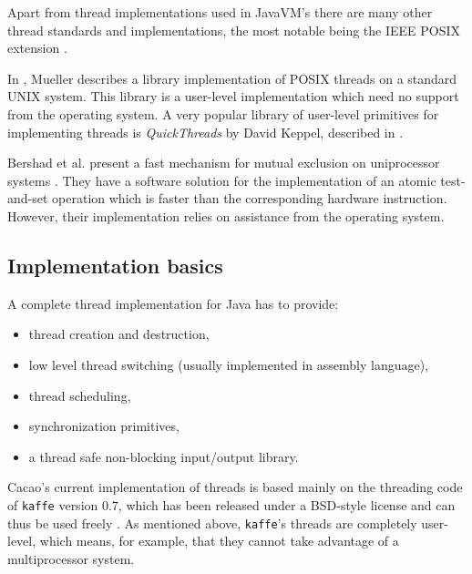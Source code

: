 Apart from thread implementations used in JavaVM's there are many
other thread standards and implementations, the most notable being the
IEEE POSIX extension \cite{PosixThreads96}.

In \cite{Mueller93}, Mueller describes a library implementation of
POSIX threads on a standard UNIX system. This library is a user-level
implementation which need no support from the operating system. A very
popular library of user-level primitives for implementing threads is
{\em QuickThreads} by David Keppel, described in \cite{Keppel93}.

Bershad et al. present a fast mechanism for mutual exclusion on
uniprocessor systems \cite{Bershad+92}. They have a software solution
for the implementation of an atomic test-and-set operation which is
faster than the corresponding hardware instruction. However, their
implementation relies on assistance from the operating system.


\subsection{Implementation basics}

A complete thread implementation for Java has to provide:

\begin{itemize}

\item thread creation and destruction,

\item low level thread switching (usually implemented in assembly
      language),

\item thread scheduling,

\item synchronization primitives,

\item a thread safe non-blocking input/output library.

\end{itemize}

Cacao's current implementation of threads is based mainly on the
threading code of {\tt kaffe} version 0.7, which has been released
under a BSD-style license and can thus be used freely
\cite{Wilkinson:97}. As mentioned above, {\tt kaffe}'s threads are
completely user-level, which means, for example, that they cannot take
advantage of a multiprocessor system.

